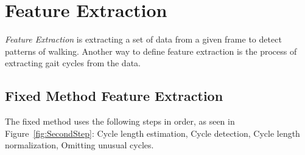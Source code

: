 \documentclass{sig-alternate}
\begin{document}
\section{Feature Extraction}
	\textit{Feature Extraction} is extracting a set of data from a given frame to detect patterns of walking. Another way to define feature extraction is the process of extracting gait cycles from the data. 		%
\subsection{Fixed Method Feature Extraction}
	The fixed method uses the following steps in order, as seen in Figure~\ref{fig:SecondStep}: Cycle length estimation, Cycle detection, Cycle length normalization, Omitting unusual cycles. 
	
\end{document}
